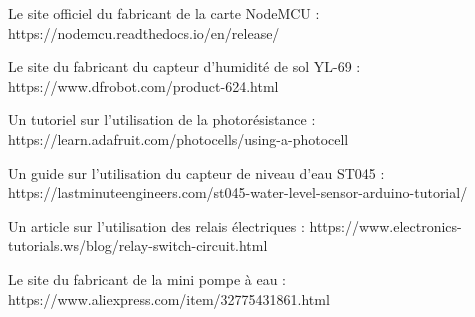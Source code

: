 \begin{flushleft}
    Le site officiel du fabricant de la carte NodeMCU : https://nodemcu.readthedocs.io/en/release/
    
    Le site du fabricant du capteur d'humidité de sol YL-69 : https://www.dfrobot.com/product-624.html
    
    Un tutoriel sur l'utilisation de la photorésistance : https://learn.adafruit.com/photocells/using-a-photocell
    
    Un guide sur l'utilisation du capteur de niveau d'eau ST045 : https://lastminuteengineers.com/st045-water-level-sensor-arduino-tutorial/
    
    Un article sur l'utilisation des relais électriques : https://www.electronics-tutorials.ws/blog/relay-switch-circuit.html
    
    Le site du fabricant de la mini pompe à eau : https://www.aliexpress.com/item/32775431861.html
\end{flushleft}

